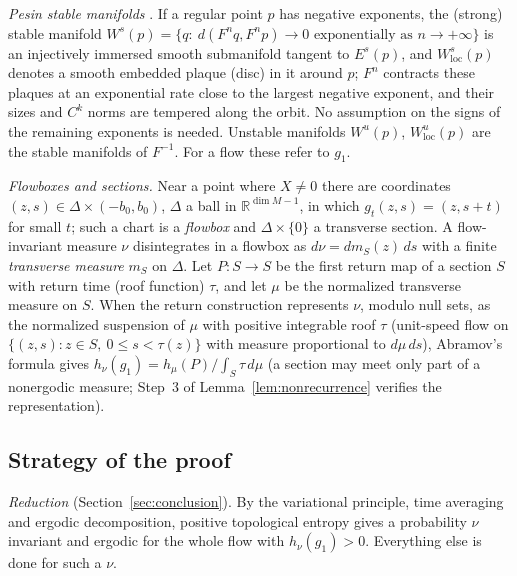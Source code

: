 \documentclass[11pt]{article}
\theoremstyle{remark}
\newcommand{\R}{\mathbb R}
\begin{document}
\emph{Pesin stable manifolds} \cite{Pesin1976}.  If a regular point
\(p\) has negative exponents, the (strong) stable manifold
\(W^s(p)=\{q:\ d(F^nq,F^np)\to0\text{ exponentially as }n\to+\infty\}\)
is an injectively immersed smooth submanifold tangent to
\(E^s(p)\), and \(W^s_{\mathrm{loc}}(p)\) denotes a smooth embedded
plaque (disc) in it around \(p\); \(F^n\) contracts these plaques at
an exponential rate close to the largest negative exponent, and their
sizes and \(C^k\) norms are tempered along the orbit.  No assumption
on the signs of the remaining exponents is needed.
Unstable manifolds \(W^u(p)\), \(W^u_{\mathrm{loc}}(p)\) are the
stable manifolds of \(F^{-1}\).  For a flow these refer to
\(g_1\).

\emph{Flowboxes and sections.}  Near a point where \(X\ne0\) there
are coordinates \((z,s)\in \Delta\times(-b_0,b_0)\), \(\Delta\) a ball in
\(\R^{\dim M-1}\), in which \(g_t(z,s)=(z,s+t)\) for small \(t\); such
a chart is a \emph{flowbox} and \(\Delta\times\{0\}\) a transverse
section.  A flow-invariant measure \(\nu\) disintegrates in a flowbox
as \(d\nu=dm_S(z)\,ds\) with a finite \emph{transverse measure}
\(m_S\) on \(\Delta\).  Let \(P:S\to S\) be the first return map of a
section \(S\) with return time (roof function) \(\tau\), and let
\(\mu\) be the normalized transverse measure on \(S\).  When the
return construction represents \(\nu\), modulo null sets, as the
normalized suspension of \(\mu\) with positive integrable roof
\(\tau\) (unit-speed flow on \(\{(z,s):z\in S,\ 0\le s<\tau(z)\}\)
with measure proportional to \(d\mu\,ds\)), Abramov's formula
\cite{Abramov1959} gives
\(h_\nu(g_1)=h_\mu(P)/\int_S\tau\,d\mu\) (a section may meet only part
of a nonergodic measure; Step~3 of Lemma~\ref{lem:nonrecurrence}
verifies the representation).

\subsection{Strategy of the proof}
\label{sec:strategy}

\emph{Reduction} (Section~\ref{sec:conclusion}).
By the variational principle, time averaging and ergodic
decomposition, positive topological entropy gives a probability
\(\nu\) invariant and ergodic for the whole flow with
\(h_\nu(g_1)>0\).  Everything else is done for such a \(\nu\).
\end{document}
